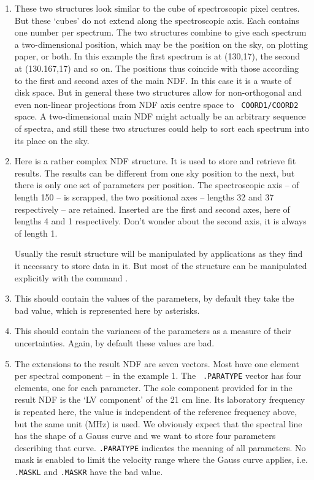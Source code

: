 \begin{enumerate}
\item These two structures look similar to the cube of spectroscopic
   pixel centres. But these `cubes' do not extend along the
   spectroscopic axis. Each contains one number per spectrum. The two
   structures combine to give each spectrum a two-dimensional position,
   which may be the position on the sky, on plotting paper, or both. In this
   example the first spectrum is at (130,17), the second at (130.167,17) and
   so on.  The positions thus coincide with those according to the first and
   second axes of the main NDF. In this case it is a waste of disk
   space. But in general these two structures allow for non-orthogonal
   and even non-linear projections from NDF axis centre space to {\tt
   COORD1/COORD2} space. A two-dimensional main NDF might actually be an
   arbitrary sequence of spectra, and still these two structures could
   help to sort each spectrum into its place on the sky.

\item Here is a rather complex NDF structure. It is used to store and
   retrieve fit results. The results can be different from one sky
   position to the next, but there is only one set of parameters per
   position. The spectroscopic axis -- of length 150 -- is scrapped, the
   two positional axes -- lengths 32 and 37 respectively -- are
   retained. Inserted are the first and second axes, here of lengths 4
   and 1 respectively. Don't wonder about the second axis, it is always
   of length 1.

   Usually the result structure will be manipulated by applications as
   they find it necessary to store data in it. But most of the structure
   can be manipulated explicitly with the command
{\tt{}}.

\item This should contain the values of the parameters, by default they
   take the bad value, which is represented here by asterisks.

\item This should contain the variances of the parameters as a measure
   of their uncertainties. Again, by default these values are bad.

\item The extensions to the result NDF are seven vectors. Most have one
   element per spectral component -- in the example 1. The {\tt
   .PARATYPE} vector has four elements, one for each parameter. The sole
   component provided for in the result NDF is the `LV component' of
   the 21 cm line. Its laboratory frequency is repeated here, the value
   is independent of the reference frequency above, but the same unit
   (MHz) is used. We obviously expect that the spectral line has the
   shape of a Gauss curve and we want to store four parameters
   describing that curve. {\tt .PARATYPE} indicates the meaning of all
   parameters. No mask is enabled to limit the velocity range where the
   Gauss curve applies, i.e. {\tt .MASKL} and {\tt .MASKR} have the bad
   value.


\end{enumerate}
